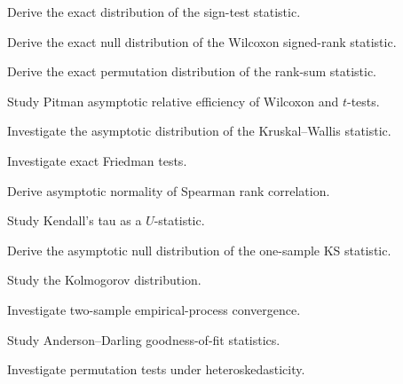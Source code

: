\begin{exercise}[4]
Derive the exact distribution of the sign-test statistic.
\end{exercise}

\begin{exercise}[4]
Derive the exact null distribution of the Wilcoxon signed-rank statistic.
\end{exercise}

\begin{exercise}[4]
Derive the exact permutation distribution of the rank-sum statistic.
\end{exercise}

\begin{exercise}[4]
Study Pitman asymptotic relative efficiency of Wilcoxon and \(t\)-tests.
\end{exercise}

\begin{exercise}[4]
Investigate the asymptotic distribution of the Kruskal--Wallis statistic.
\end{exercise}

\begin{exercise}[4]
Investigate exact Friedman tests.
\end{exercise}

\begin{exercise}[4]
Derive asymptotic normality of Spearman rank correlation.
\end{exercise}

\begin{exercise}[4]
Study Kendall's tau as a \(U\)-statistic.
\end{exercise}

\begin{exercise}[4]
Derive the asymptotic null distribution of the one-sample KS statistic.
\end{exercise}

\begin{exercise}[4]
Study the Kolmogorov distribution.
\end{exercise}

\begin{exercise}[4]
Investigate two-sample empirical-process convergence.
\end{exercise}

\begin{exercise}[4]
Study Anderson--Darling goodness-of-fit statistics.
\end{exercise}

\begin{exercise}[4]
Investigate permutation tests under heteroskedasticity.
\end{exercise}

